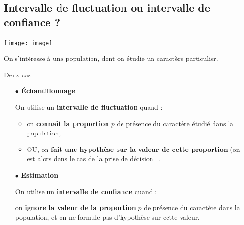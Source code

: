 \begin{spacing}{1.2}
\begin{enumerate}
\begin{minipage}{0.95\linewidth}
\begin{alterqcm}[VF,lq=125mm,correction,
symb = \dingsquare,
corsymb = \dingchecksquare]
\AQquestion[br=1]{Pour tout $x \in ]-3~;~2],~f'(x) \geqslant 0$.}
\end{alterqcm}
\end{minipage}

\end{enumerate}
\newpage
\subsection{Intervalle de fluctuation ou intervalle de confiance ?}


\begin{center}
\texttt{[image: image]}
\end{center}

On s'intéresse à une population, dont on étudie un caractère particulier.

\medskip

\begin{bclogo}[couleur = gray!30 , arrondi = 0.1 ,logo = \bclampe , barre = snake , tailleOndu = 1.5]{Deux cas}
\begin{itemize}
\item[$\bullet$] \textbf{\'Echantillonnage}

On utilise un \textbf{intervalle de fluctuation} quand :
	\begin{itemize}
	\item on \textbf{connaît la proportion} $p$ de présence du caractère étudié dans la population,
	\item OU, on \textbf{fait une hypothèse sur la valeur de cette proportion} (on est alors dans le cas de la \og prise de décision\fg~ .
	\end{itemize}

\item[$\bullet$] \textbf{Estimation}

On utilise un \textbf{intervalle de confiance} quand :

on \textbf{ignore la valeur de la proportion} $p$ de présence du caractère dans la population, et on ne formule pas d'hypothèse sur cette valeur.
\end{itemize}
\end{bclogo}


\end{spacing}

